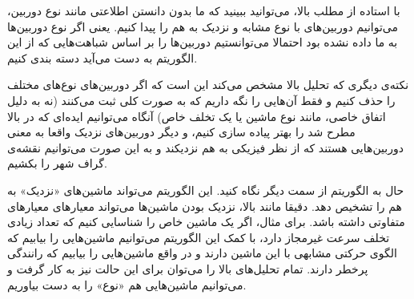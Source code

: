 با استاده از مطلب بالا، می‌توانید ببینید که ما بدون دانستن اطلاعتی مانند نوع دوربین، می‌توانیم 
دوربین‌های با نوع مشابه و نزدیک به هم را پیدا کنیم. یعنی اگر نوع دوربین‌ها به ما داده نشده بود 
احتمالا می‌توانستیم دوربین‌ها را بر اساس شباهت‌هایی که از این الگوریتم به دست می‌آید دسته بندی کنیم. 

نکته‌ی دیگری که تحلیل بالا مشخص می‌کند این است که اگر دوربین‌های نوع‌های مختلف را حذف کنیم و فقط 
آن‌هایی را نگه داریم که به صورت کلی ثبت می‌کنند (نه به دلیل اتفاق خاصی، مانند نوع ماشین یا یک تخلف خاص) 
آنگاه می‌توانیم ایده‌ای که در بالا مطرح شد را بهتر پیاده سازی کنیم، و دیگر دوربین‌های 
نزدیک واقعا به معنی دوربین‌هایی هستند که از نظر فیزیکی به هم نزدیکند و به 
این صورت می‌توانیم نقشه‌ی گراف شهر را بکشیم. 

حال به الگوریتم از سمت دیگر نگاه کنید. این الگوریتم می‌تواند ماشین‌های «نزدیک» 
به هم را تشخیص دهد. دقیقا مانند بالا، نزدیک بودن ماشین‌ها می‌تواند معیار‌های معیار‌های متفاوتی 
داشته باشد. برای مثال، اگر یک ماشین خاص را شناسایی کنیم که تعداد زیادی 
تخلف سرعت غیرمجاز دارد، با کمک این الگوریتم می‌توانیم ماشین‌هایی را بیابیم 
که الگوی حرکتی مشابهی با این ماشین دارند و در واقع ماشین‌هایی را بیابیم 
که رانندگی پرخطر دارند. تمام تحلیل‌های بالا را می‌توان برای این حالت نیز 
به کار گرفت و می‌توانیم ماشین‌هایی هم «نوع» را به دست بیاوریم. 

